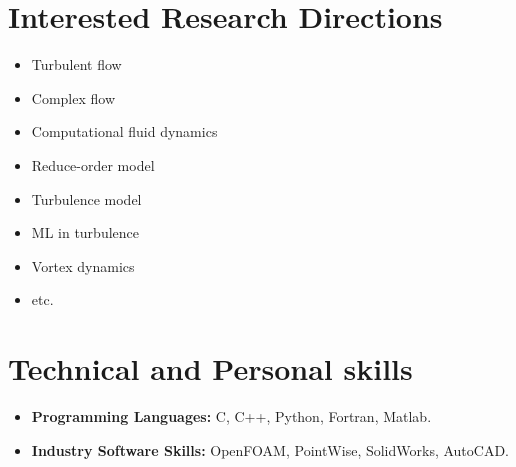 \documentclass[12pt,letter]{article}
\newcommand{\PKU}{Peking University}
\newcommand{\USTC}{University of Science and Technology of China}
\newcommand{\Year}[1]{\fontsize{12pt}{0}\selectfont \texttt{#1}}
\begin{document}
\section{Interested Research Directions}

\begin{itemize}
\vspace{6pt}
\item Turbulent flow
\vspace{6pt}
\item Complex flow
\vspace{6pt}
\item Computational fluid dynamics
\vspace{6pt}
\item Reduce-order model
\vspace{6pt}
\item Turbulence model
\vspace{6pt}
\item ML in turbulence
\vspace{6pt}
\item Vortex dynamics
\vspace{6pt}
\item etc.
\end{itemize}

\begin{comment}
    
\section{Work Experience}
\begin{EntriesTableYear}
    \Year{2017} & 
    \textit{Teaching Assistant}
    \newline
    Electromagnetism, \USTC\\
    \Year{2018} & 
    \textit{Teaching Assistant}
    \newline
    Electromagnetism, \USTC\\
    \Year{2018} & 
    \textit{Teaching Assistant}
    \newline
    Complex Analysis, \USTC\\
    \Year{2019} & 
    \textit{Teaching Assistant}
    \newline
    Calculation Method, \USTC\\
    \Year{2019} & 
    \textit{Teaching Assistant}
    \newline
    Advanced Mathematics, \PKU\\
\end{EntriesTableYear}
\end{comment}

\section{Technical and Personal skills}

\vspace{6pt}

\begin{itemize}
\vspace{6pt}
\item \textbf{Programming Languages:} C, C++, Python, Fortran, Matlab.
\vspace{6pt}
\item \textbf{Industry Software Skills:} OpenFOAM, PointWise, SolidWorks, AutoCAD.
\end{itemize}
\end{document}
